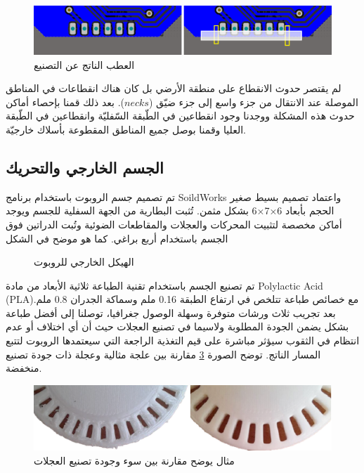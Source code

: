 \begin{figure}[h]
	\centering
	\includegraphics[width=0.9\linewidth]{figs/15/fig15_3}
	\caption{العطب الناتج عن التصنيع}
	\label{15:fig:3}
\end{figure}

لم يقتصر حدوث الانقطاع على منطقة الأرضي بل كان هناك انقطاعات في المناطق الموصلة عند الانتقال من جزء واسع إلى جزء ضيّق ($ necks $). بعد ذلك قمنا بإحصاء أماكن حدوث هذه المشكلة ووجدنا وجود انقطاعين في الطّبقة السّفليّة وانقطاعين في الطّبقة العليا وقمنا بوصل جميع المناطق المقطوعة بأسلاك خارجيّة.

\subsection{الجسم الخارجي والتحريك}

تم تصميم جسم الروبوت باستخدام برنامج SoildWorks واعتماد تصميم بسيط صغير الحجم بأبعاد 6×7×6 بشكل مثمن. تُثبت البطارية من الجهة السفلية للجسم ويوجد أماكن مخصصة لتثبيت المحركات والعجلات والمقاطعات الضوئية وتُبت الدراتين فوق الجسم باستخدام أربع براغي. كما هو موضح في الشكل 

 \begin{figure}[htbp]
	\centering
	
	\caption{ الهيكل الخارجي للروبوت}
	\label{15:fig:5}
\end{figure}

تم تصنيع الجسم باستخدام تقنية الطباعة ثلاثية الأبعاد من مادة  Polylactic Acid (PLA)مع خصائص طباعة تتلخص في ارتفاع الطبقة 0.16 ملم وسماكة الجدران 0.8 ملم. 
بعد تجريب ثلاث ورشات متوفرة وسهلة الوصول جغرافيا، توصلنا إلى أفضل طباعة بشكل يضمن الجودة المطلوبة ولاسيما في تصنيع العجلات حيث أن أي اختلاف أو عدم انتظام في الثقوب سيؤثر مباشرة على قيم التغذية الراجعة التي سيعتمدها الروبوت لتتبع المسار الناتج. توضح الصورة \ref{15:fig:6} مقارنة بين علجة مثالية وعجلة ذات جودة تصنيع منخفضة.


\begin{figure}[h]
	\centering
	\includegraphics[width=0.9\linewidth]{figs/15/fig15_6}
	\caption{ مثال يوضح مقارنة بين سوء وجودة تصنيع العجلات}
	\label{15:fig:6}
\end{figure}



